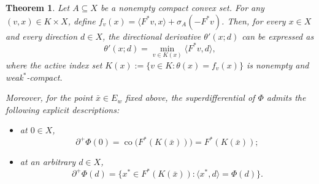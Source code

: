 \documentclass[11pt]{article}
\newtheorem{theorem}{Theorem}[section]
\begin{document}
\begin{theorem} \label{AXDSS}
	Let $A \subseteq X$ be a nonempty compact convex set. For any $(v,x) \in K \times X$, define  
	$f_v(x) = \langle F^*v, x \rangle + \sigma_A(-F^*v)$.  
	Then, for every $x \in X$ and every direction $d \in X$, the directional derivative $\theta'(x;d)$ can be expressed as
	\begin{equation}\label{eq:deriV1}
		\theta'(x;d) = \min_{v \in K(x)} \langle F^*v, d \rangle,
	\end{equation}
	where the active index set  
	$K(x) := \{ v \in K : \theta(x) = f_v(x) \}$  
	is nonempty and weak$^*$-compact.
	
	Moreover, for the point $\bar{x} \in E_w$ fixed above, the superdifferential of $\Phi$ admits the following explicit descriptions:
	\begin{itemize}
		\item[(i)] at $0 \in X$,
		\[
		\partial^+ \Phi(0) = \operatorname{co}\bigl(F^*(K(\bar{x}))\bigr) = F^*(K(\bar{x}));
		\]
		\item[(ii)] at an arbitrary $d \in X$,
		\[
		\partial^+ \Phi(d) = \{ x^* \in F^*(K(\bar{x})) : \langle x^*, d \rangle = \Phi(d) \}.
		\]
	\end{itemize}
\end{theorem}
\end{document}
